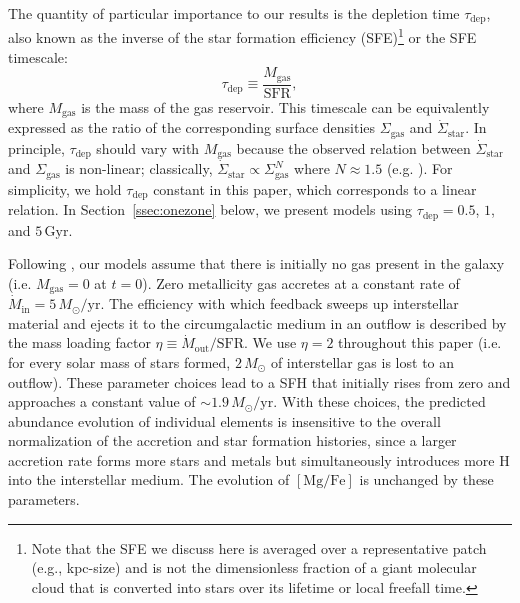 \documentclass[twocolumn]{aastex631}
\newcommand{\Msun}{\ensuremath{M_{\odot}}}
\newcommand{\Gyr}{\ensuremath{\textrm{Gyr}}}
\newcommand{\MgFe}{\ensuremath{[\textrm{Mg}/\textrm{Fe}]}}
\newcommand{\Msunyr}{\ensuremath{\Msun/\textrm{yr}}}
\newcommand{\SFR}{\ensuremath{\textrm{SFR}}}
\begin{document}
The quantity of particular importance to our results is the depletion time $\tau_{\textrm{dep}}$, also known as the inverse of the star formation efficiency (SFE)\footnote{Note that the SFE we discuss here is averaged over a representative patch (e.g., kpc-size) and is not the dimensionless fraction of a giant molecular cloud that is converted into stars over its lifetime or local freefall time.} or the SFE timescale:
\begin{equation}
\tau_{\textrm{dep}} \equiv \frac{M_{\textrm{gas}}}{\SFR},
\end{equation}
where $M_{\textrm{gas}}$ is the mass of the gas reservoir. This timescale can be equivalently expressed as the ratio of the corresponding surface densities $\Sigma_{\textrm{gas}}$ and $\dot{\Sigma}_{\textrm{star}}$. In principle, $\tau_{\textrm{dep}}$ should vary with $M_{\textrm{gas}}$ because the observed relation between $\dot{\Sigma}_{\textrm{star}}$ and $\Sigma_{\textrm{gas}}$ is non-linear; classically, $\dot{\Sigma}_{\textrm{star}} \propto \Sigma_{\textrm{gas}}^N$ where $N \approx 1.5$ (e.g. \citealt{Schmidt1959, Kennicutt1998}). For simplicity, we hold $\tau_{\textrm{dep}}$ constant in this paper, which corresponds to a linear relation. In Section~\ref{ssec:onezone} below, we present models using $\tau_{\textrm{dep}} = 0.5$, $1$, and $5\,\Gyr$.

Following \citet{2022arXiv220402989C}, our models assume that there is initially no gas present in the galaxy (i.e. $M_{\textrm{gas}} = 0$ at $t = 0$). Zero metallicity gas accretes at a constant rate of $\dot{M}_\text{in} = 5\,\Msunyr$. The efficiency with which feedback sweeps up interstellar material and ejects it to the circumgalactic medium in an outflow is described by the mass loading factor $\eta \equiv \dot{M}_\text{out} / \SFR$. We use $\eta = 2$ throughout this paper (i.e. for every solar mass of stars formed, $2\,\Msun$ of interstellar gas is lost to an outflow). These parameter choices lead to a SFH that initially rises from zero and approaches a constant value of $\sim1.9\,\Msunyr$. With these choices, the predicted abundance evolution of individual elements is insensitive to the overall normalization of the accretion and star formation histories, since a larger accretion rate forms more stars and metals but simultaneously introduces more H into the interstellar medium. The evolution of \MgFe{} is unchanged by these parameters.
\end{document}
